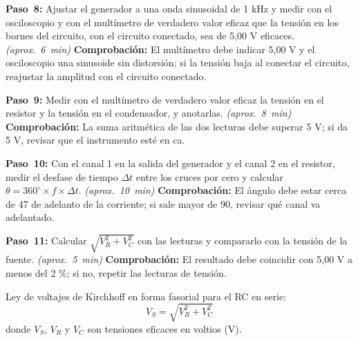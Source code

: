 \documentclass[12pt]{article}
\begin{document}
\begin{pasos}
  \item \textbf{Paso~8:} Ajustar el generador a una onda sinusoidal de 1 kHz y medir con el osciloscopio y con el multímetro de verdadero valor eficaz que la tensión en los bornes del circuito, con el circuito conectado, sea de 5,00 V eficaces. \emph{(aprox.~\SI{6}{\minute})} \textbf{Comprobación:} El multímetro debe indicar 5,00 V y el osciloscopio una sinusoide sin distorsión; si la tensión baja al conectar el circuito, reajustar la amplitud con el circuito conectado.
  \item \textbf{Paso~9:} Medir con el multímetro de verdadero valor eficaz la tensión en el resistor y la tensión en el condensador, y anotarlas. \emph{(aprox.~\SI{8}{\minute})} \textbf{Comprobación:} La suma aritmética de las dos lecturas debe superar 5 V; si da 5 V, revisar que el instrumento esté en ca.
  \item \textbf{Paso~10:} Con el canal 1 en la salida del generador y el canal 2 en el resistor, medir el desfase de tiempo $\Delta t$ entre los cruces por cero y calcular $\theta = 360^\circ \times f \times \Delta t$. \emph{(aprox.~\SI{10}{\minute})} \textbf{Comprobación:} El ángulo debe estar cerca de 47\textdegree{} de adelanto de la corriente; si sale mayor de 90\textdegree{}, revisar qué canal va adelantado.
  \item \textbf{Paso~11:} Calcular $\sqrt{V_R^2 + V_C^2}$ con las lecturas y compararlo con la tensión de la fuente. \emph{(aprox.~\SI{5}{\minute})} \textbf{Comprobación:} El resultado debe coincidir con 5,00 V a menos del 2 \%; si no, repetir las lecturas de tensión.
\par Ley de voltajes de Kirchhoff en forma fasorial para el RC en serie:
\begin{equation}
  V_S = \sqrt{V_R^2 + V_C^2}
  \label{eq:paso-11}
\end{equation}
donde $V_S$, $V_R$ y $V_C$ son tensiones eficaces en voltios (V).
\end{pasos}
\end{document}
